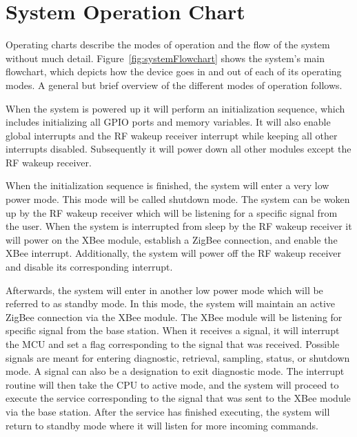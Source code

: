 \section{System Operation Chart}
\label{sec:operatingChart}


Operating charts describe the modes of operation and the flow of the system without much detail. Figure~\ref{fig:systemFlowchart} shows the system's main flowchart, which depicts how the device goes in and out of each of its operating modes.  A general but brief overview of the different modes of operation follows.

When the system is powered up it will perform an initialization sequence, which includes initializing all GPIO ports and memory variables. It will also enable global interrupts and the RF wakeup receiver interrupt while keeping all other interrupts disabled. Subsequently it will power down all other modules except the RF wakeup receiver.

When the initialization sequence is finished, the system will enter a very low power mode. This mode will be called shutdown mode. The system can be woken up by the RF wakeup receiver which will be listening for a specific signal from the user. When the system is interrupted from sleep by the RF wakeup receiver it will power on the XBee module, establish a ZigBee connection, and enable the XBee interrupt. Additionally, the system will power off the RF wakeup receiver and disable its corresponding interrupt.

Afterwards, the system will enter in another low power mode which will be referred to as standby mode. In this mode, the system will maintain an active ZigBee connection via the XBee module. The XBee module will be listening for specific signal from the base station. When it receives a signal, it will interrupt the MCU and set a flag corresponding to the signal that was received. Possible signals are meant for entering diagnostic, retrieval, sampling, status, or shutdown mode. A signal can also be a designation to exit diagnostic mode. The interrupt routine will then take the CPU to active mode, and the system will proceed to execute the service corresponding to the signal that was sent to the XBee module via the base station. After the service has finished executing, the system will return to standby mode where it will listen for more incoming commands.